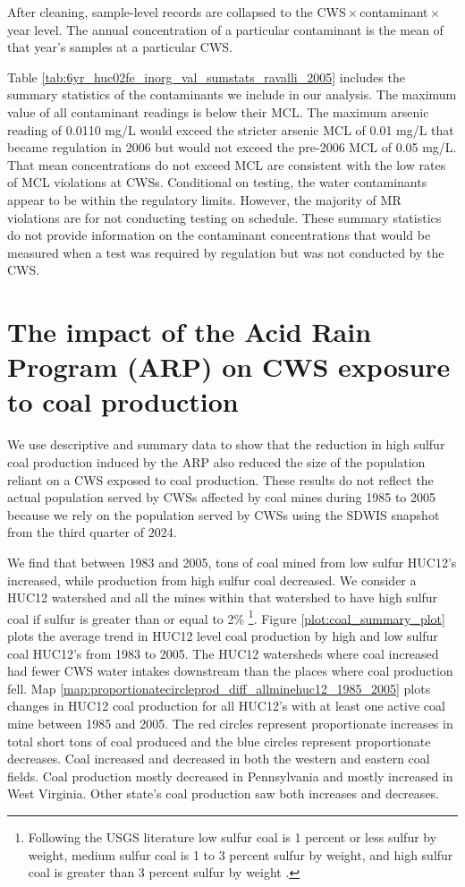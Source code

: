\documentclass{article}
\begin{document}
After cleaning, sample-level records are collapsed to the CWS\,$\times$\,contaminant\,$\times$\,year level. The annual concentration of a particular contaminant is the mean of that year's samples at a particular CWS.

Table \ref{tab:6yr_huc02fe_inorg_val_sumstats_ravalli_2005} includes the summary statistics of the contaminants we include in our analysis. The maximum value of all contaminant readings is below their MCL. The maximum arsenic reading of 0.0110 mg/L would exceed the stricter arsenic MCL of 0.01 mg/L that became regulation in 2006 but would not exceed the pre-2006 MCL of 0.05 mg/L. That mean concentrations do not exceed MCL are consistent with the low rates of MCL violations at CWSs. Conditional on testing, the water contaminants appear to be within the regulatory limits. However, the majority of MR violations are for not conducting testing on schedule. These summary statistics do not provide information on the contaminant concentrations that would be measured when a test was required by regulation but was not conducted by the CWS.



\section{The impact of the Acid Rain Program (ARP) on CWS exposure to coal production}

We use descriptive and summary data to show that the reduction in high sulfur coal production induced by the ARP also reduced the size of the population reliant on a CWS exposed to coal production. These results do not reflect the actual population served by CWSs affected by coal mines during 1985 to 2005 because we rely on the population served by CWSs using the SDWIS snapshot from the third quarter of 2024.

We find that between 1983 and 2005, tons of coal mined from low sulfur HUC12's increased, while production from high sulfur coal decreased. We consider a HUC12 watershed and all the mines within that watershed to have high sulfur coal if sulfur is greater than or equal to 2\% \footnote{Following the USGS literature low sulfur coal is 1 percent or less sulfur by weight, medium sulfur coal is 1 to 3 percent sulfur by weight, and high sulfur coal is greater than 3 percent sulfur by weight \cite{schweinfurth2009introduction}.}. Figure \ref{plot:coal_summary_plot} plots the average trend in HUC12 level coal production by high and low sulfur coal HUC12's from 1983 to 2005. The HUC12 watersheds where coal increased had fewer CWS water intakes downstream than the places where coal production fell. Map \ref{map:proportionatecircleprod_diff_allminehuc12_1985_2005} plots changes in HUC12 coal production for all HUC12's with at least one active coal mine between 1985 and 2005. The red circles represent proportionate increases in total short tons of coal produced and the blue circles represent proportionate decreases. Coal increased and decreased in both the western and eastern coal fields. Coal production mostly decreased in Pennsylvania and mostly increased in West Virginia. Other state's coal production saw both increases and decreases.
\end{document}
